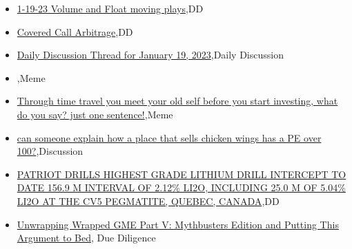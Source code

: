 \documentclass{article}%
\begin{document}
%
\begin{itemize}%
\item%
\href{https://reddit.com/r/wallstreetbets/comments/10g0rnt/11923\_volume\_and\_float\_moving\_plays/}{1-19-23 Volume and Float moving plays},DD%
\item%
\href{https://reddit.com/r/wallstreetbets/comments/10g0bxe/covered\_call\_arbitrage/}{Covered Call Arbitrage},DD%
\item%
\href{https://reddit.com/r/wallstreetbets/comments/10fywbv/daily\_discussion\_thread\_for\_january\_19\_2023/}{Daily Discussion Thread for January 19, 2023},Daily Discussion%
\item%
\href{https://reddit.com/r/wallstreetbets/comments/10fx65s/\_/}{},Meme%
\item%
\href{https://reddit.com/r/wallstreetbets/comments/10fwsij/through\_time\_travel\_you\_meet\_your\_old\_self\_before/}{Through time travel you meet your old self before you start investing, what do you say? just one sentence!},Meme%
\item%
\href{https://reddit.com/r/wallstreetbets/comments/10fwojw/can\_someone\_explain\_how\_a\_place\_that\_sells/}{can someone explain how a place that sells chicken wings has a PE over 100?},Discussion%
\item%
\href{https://reddit.com/r/Baystreetbets/comments/10foycc/patriot\_drills\_highest\_grade\_lithium\_drill/}{PATRIOT DRILLS HIGHEST GRADE LITHIUM DRILL INTERCEPT TO DATE  156.9 M INTERVAL OF 2.12\% LI2O, INCLUDING 25.0 M OF 5.04\% LI2O  AT THE CV5 PEGMATITE, QUEBEC, CANADA},DD%
\item%
\href{https://reddit.com/r/Superstonk/comments/10fz3kk/unwrapping\_wrapped\_gme\_part\_v\_mythbusters\_edition/}{Unwrapping Wrapped GME Part V: Mythbusters Edition and Putting This Argument to Bed}, Due Diligence%
\end{itemize}%
\end{document}
